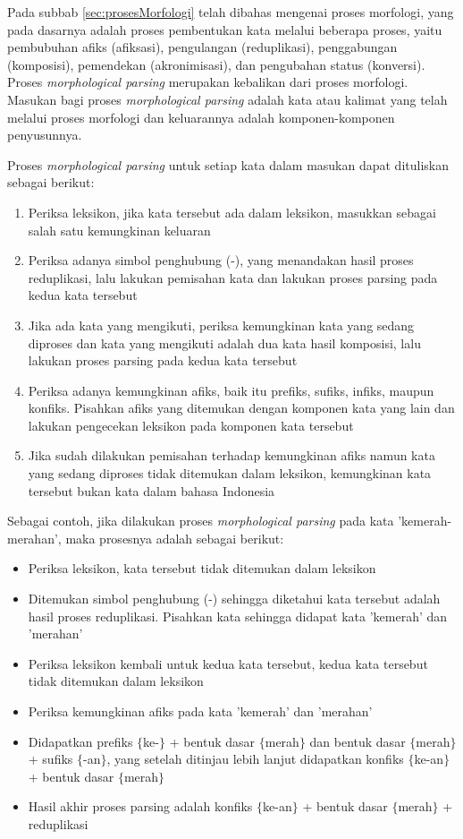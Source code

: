 Pada subbab \ref{sec:prosesMorfologi} telah dibahas mengenai proses morfologi, yang pada dasarnya adalah proses pembentukan kata melalui beberapa proses, yaitu pembubuhan afiks (afiksasi), pengulangan (reduplikasi), penggabungan (komposisi), pemendekan (akronimisasi), dan pengubahan status (konversi). Proses \textit{morphological parsing} merupakan kebalikan dari proses morfologi. Masukan bagi proses \textit{morphological parsing} adalah kata atau kalimat yang telah melalui proses morfologi dan keluarannya adalah komponen-komponen penyusunnya.

Proses \textit{morphological parsing} untuk setiap kata dalam masukan dapat dituliskan sebagai berikut:
\begin{enumerate}
	\item Periksa leksikon, jika kata tersebut ada dalam leksikon, masukkan sebagai salah satu kemungkinan keluaran
	\item Periksa adanya simbol penghubung (-), yang menandakan hasil proses reduplikasi, lalu lakukan pemisahan kata dan lakukan proses parsing pada kedua kata tersebut
	\item Jika ada kata yang mengikuti, periksa kemungkinan kata yang sedang diproses dan kata yang mengikuti adalah dua kata hasil komposisi, lalu lakukan proses parsing pada kedua kata tersebut
	\item Periksa adanya kemungkinan afiks, baik itu prefiks, sufiks, infiks, maupun konfiks. Pisahkan afiks yang ditemukan dengan komponen kata yang lain dan lakukan pengecekan leksikon pada komponen kata tersebut
	\item Jika sudah dilakukan pemisahan terhadap kemungkinan afiks namun kata yang sedang diproses tidak ditemukan dalam leksikon, kemungkinan kata tersebut bukan kata dalam bahasa Indonesia
\end{enumerate}

Sebagai contoh, jika dilakukan proses \textit{morphological parsing} pada kata 'kemerah-merahan', maka prosesnya adalah sebagai berikut:
\begin{itemize}
	\item Periksa leksikon, kata tersebut tidak ditemukan dalam leksikon
	\item Ditemukan simbol penghubung (-) sehingga diketahui kata tersebut adalah hasil proses reduplikasi. Pisahkan kata sehingga didapat kata 'kemerah' dan 'merahan'
	\item Periksa leksikon kembali untuk kedua kata tersebut, kedua kata tersebut tidak ditemukan dalam leksikon
	\item Periksa kemungkinan afiks pada kata 'kemerah' dan 'merahan'
	\item Didapatkan prefiks $\lbrace$ke-$\rbrace$ + bentuk dasar $\lbrace$merah$\rbrace$ dan bentuk dasar $\lbrace$merah$\rbrace$ + sufiks $\lbrace$-an$\rbrace$, yang setelah ditinjau lebih lanjut didapatkan konfiks $\lbrace$ke-an$\rbrace$ + bentuk dasar $\lbrace$merah$\rbrace$
	\item Hasil akhir proses parsing adalah konfiks $\lbrace$ke-an$\rbrace$ + bentuk dasar $\lbrace$merah$\rbrace$ + reduplikasi
\end{itemize}


